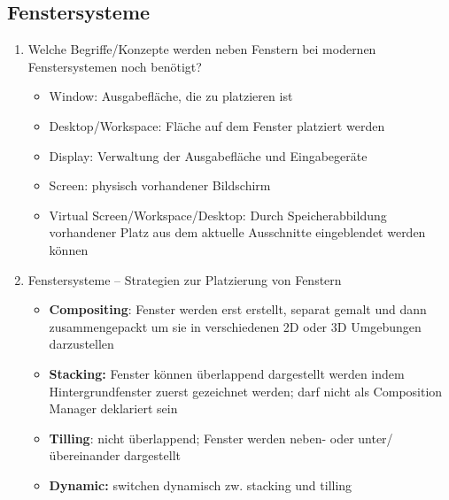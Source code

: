 \subsection{Fenstersysteme}
\begin{enumerate}
	\item Welche Begriffe/Konzepte werden neben Fenstern bei
	modernen Fenstersystemen noch benötigt?
	\begin{itemize}
		\item Window: Ausgabefläche, die zu platzieren ist
		\item Desktop/Workspace: Fläche auf dem Fenster platziert werden
		\item Display: Verwaltung der Ausgabefläche und Eingabegeräte
		\item Screen: physisch vorhandener Bildschirm
		\item Virtual Screen/Workspace/Desktop: Durch Speicherabbildung vorhandener Platz aus dem aktuelle Ausschnitte eingeblendet werden können
	\end{itemize}
	
	\item Fenstersysteme – Strategien zur Platzierung von Fenstern
	\begin{itemize}
		\item \textbf{Compositing}: Fenster werden erst erstellt, separat gemalt und dann zusammengepackt um sie in verschiedenen 2D oder 3D Umgebungen darzustellen
		\item \textbf{Stacking:} Fenster können überlappend dargestellt werden indem Hintergrundfenster zuerst gezeichnet werden; darf nicht als Composition Manager deklariert sein
		\item \textbf{Tilling}: nicht überlappend; Fenster werden neben- oder unter/übereinander dargestellt
		\item \textbf{Dynamic:} switchen dynamisch zw. stacking und tilling
	\end{itemize}	
	

\end{enumerate}
